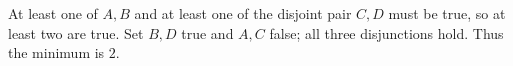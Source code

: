 At least one of $A,B$ and at least one of the disjoint pair $C,D$ must be true, so at least two are true. Set $B,D$ true and $A,C$ false; all three disjunctions hold. Thus the minimum is $\boxed2$.
